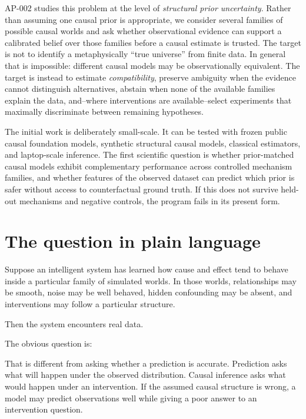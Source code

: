 \documentclass[11pt]{article}
\begin{document}
AP-002 studies this problem at the level of \emph{structural prior uncertainty}. Rather than assuming one causal prior is appropriate, we consider several families of possible causal worlds and ask whether observational evidence can support a calibrated belief over those families before a causal estimate is trusted. The target is not to identify a metaphysically ``true universe'' from finite data. In general that is impossible: different causal models may be observationally equivalent. The target is instead to estimate \emph{compatibility}, preserve ambiguity when the evidence cannot distinguish alternatives, abstain when none of the available families explain the data, and--where interventions are available--select experiments that maximally discriminate between remaining hypotheses.

The initial work is deliberately small-scale. It can be tested with frozen public causal foundation models, synthetic structural causal models, classical estimators, and laptop-scale inference. The first scientific question is whether prior-matched causal models exhibit complementary performance across controlled mechanism families, and whether features of the observed dataset can predict which prior is safer without access to counterfactual ground truth. If this does not survive held-out mechanisms and negative controls, the program fails in its present form.

\section{The question in plain language}

Suppose an intelligent system has learned how cause and effect tend to behave inside a particular family of simulated worlds. In those worlds, relationships may be smooth, noise may be well behaved, hidden confounding may be absent, and interventions may follow a particular structure.

Then the system encounters real data.

The obvious question is:

\begin{center}
\end{center}

That is different from asking whether a prediction is accurate. Prediction asks what will happen under the observed distribution. Causal inference asks what would happen under an intervention. If the assumed causal structure is wrong, a model may predict observations well while giving a poor answer to an intervention question.
\end{document}
